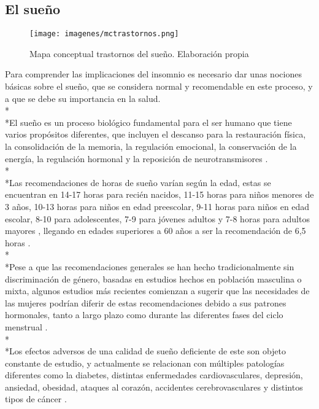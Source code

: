 \documentclass[a4paper,12pt,twoside]{memoir}
\begin{document}
    \subsection {El sueño}
    \begin{figure}
    \centering
    \texttt{[image: imagenes/mctrastornos.png]}
    \caption{Mapa conceptual trastornos del sueño. Elaboración propia}
    \label{fig:enter-label}
\end{figure}
    \text Para comprender las implicaciones del insomnio es necesario dar unas nociones básicas sobre el sueño, que se considera normal y recomendable en este proceso, y a que se debe su importancia en la salud. \\*\\*El sueño es un proceso biológico fundamental para el ser humano que tiene varios propósitos diferentes, que incluyen el descanso para la restauración física, la consolidación de la memoria, la regulación emocional, la conservación de la energía, la regulación hormonal y la reposición de neurotransmisores \cite{assefa2015}. \\*\\*Las recomendaciones de horas de sueño varían según la edad, estas se encuentran en 14-17 horas para recién nacidos, 11-15 horas para niños menores de 3 años, 10-13 horas para niños en edad preescolar, 9-11 horas para niños en edad escolar, 8-10 para adolescentes, 7-9 para jóvenes adultos y 7-8 horas para adultos mayores \cite{hirshkowitz2015}, llegando en edades superiores a 60 años a ser la recomendación de 6,5 horas \cite{ferre2020}. \\*\\*Pese a que las recomendaciones generales se han hecho tradicionalmente sin discriminación de género, basadas en estudios hechos en población masculina o mixta, algunos estudios más recientes comienzan a sugerir que las necesidades de las mujeres podrían diferir de estas recomendaciones debido a sus patrones hormonales, tanto a largo plazo como durante las diferentes fases del ciclo menstrual \cite{andersen2023}.\\*\\*Los efectos adversos de una calidad de sueño deficiente de este son objeto constante de estudio, y actualmente se relacionan con múltiples patologías diferentes como la diabetes, distintas enfermedades cardiovasculares, depresión, ansiedad, obesidad, ataques al corazón, accidentes cerebrovasculares y distintos tipos de cáncer \cite{nelson2021,ma2016}.
\end{document}
